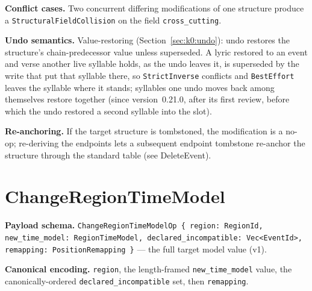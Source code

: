 \documentclass[11pt,letterpaper]{report}
\begin{document}
\textbf{Conflict cases.} Two concurrent differing modifications of one structure
produce a \texttt{StructuralFieldCollision} on the field \texttt{cross\_cutting}.

\textbf{Undo semantics.} Value-restoring (Section~\ref{sec:k0:undo}): undo
restores the structure's chain-predecessor value unless superseded. A lyric
restored to an event and verse another live syllable holds, as the undo leaves
it, is superseded by the write that put that syllable there, so
\texttt{StrictInverse} conflicts and \texttt{BestEffort} leaves the syllable
where it stands; syllables one undo moves back among themselves restore
together (since version~0.21.0, after its first review, before which the undo
restored a second syllable into the slot).

\textbf{Re-anchoring.} If the target structure is tombstoned, the modification is
a no-op; re-deriving the endpoints lets a subsequent endpoint tombstone re-anchor
the structure through the standard table (see DeleteEvent).

\section{ChangeRegionTimeModel}
\label{sec:k0:change-region-time-model}

\textbf{Payload schema.} \texttt{ChangeRegionTimeModelOp \{ region: RegionId,
new\_time\_model: RegionTimeModel, declared\_incompatible: Vec<EventId>,
remapping: PositionRemapping \}} --- the full target model value (v1).

\textbf{Canonical encoding.} \texttt{region}, the length-framed
\texttt{new\_time\_model} value, the canonically-ordered
\texttt{declared\_incompatible} set, then \texttt{remapping}.
\end{document}
